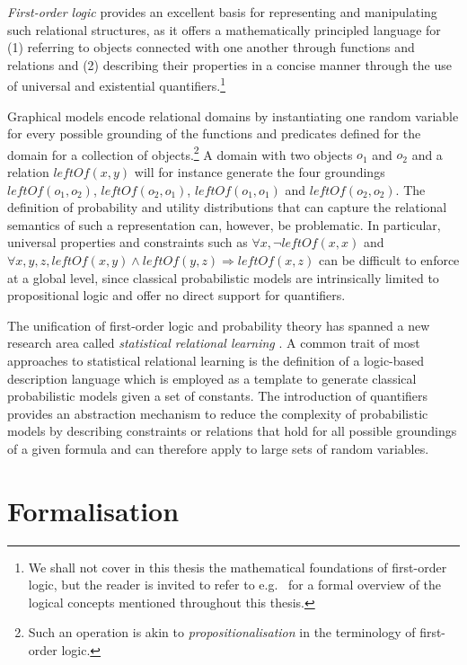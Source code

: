 \textit{First-order logic} provides an excellent basis for representing and manipulating such relational structures, as it offers a mathematically principled language for (1) referring to objects connected with one another through functions and relations and (2) describing their properties in a concise manner through the use of universal and existential quantifiers.\footnote{We shall not cover in this thesis the mathematical foundations of first-order logic, but the reader is invited to refer to e.g.\ \cite{gamut1991logic} for a formal overview of the logical concepts mentioned throughout this thesis.}

Graphical models encode relational domains by instantiating one random variable for every possible grounding of the functions and predicates defined for the domain for a collection of objects.\footnote{Such an operation is akin to \textit{propositionalisation} in the terminology of first-order logic.}  A domain with two objects $o_1$ and $o_2$ and a relation $\mathit{leftOf}(x,y)$ will for instance generate the four groundings $\mathit{leftOf}(o_1,o_2)$, $\mathit{leftOf}(o_2,o_1)$, $\mathit{leftOf}(o_1,o_1)$ and $\mathit{leftOf}(o_2,o_2)$. The definition of probability and utility distributions that can capture the relational semantics of such a representation can, however, be problematic. In particular, universal properties and constraints such as $\forall x, \neg \mathit{leftOf}(x,x)$ and $\forall x, y, z, \mathit{leftOf}(x,y) \land \mathit{leftOf}(y,z) \Rightarrow \mathit{leftOf}(x,z)$ can be difficult to enforce at a global level, since classical probabilistic models are intrinsically limited to propositional logic and offer no direct support for quantifiers. 
 
The unification of first-order logic and probability theory has spanned a new research area called \textit{statistical relational learning} \citep{getoor:srlbook07}. A common trait of most approaches to statistical relational learning is the definition of a logic-based description language which is employed as a template to generate classical probabilistic models given a set of constants. The introduction of quantifiers provides an abstraction mechanism to reduce the complexity of probabilistic models by describing constraints or relations that hold for all possible groundings of a given formula and can therefore apply to large sets of random variables. 

\section{Formalisation}
\label{sec:formalisation}

